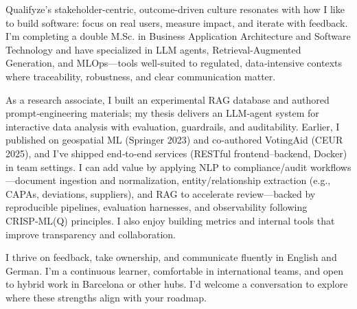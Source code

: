 Qualifyze’s stakeholder-centric, outcome-driven culture resonates with how I like to build software: focus on real users, measure impact, and iterate with feedback. I’m completing a double M.Sc. in Business Application Architecture and Software Technology and have specialized in LLM agents, Retrieval-Augmented Generation, and MLOps—tools well-suited to regulated, data‑intensive contexts where traceability, robustness, and clear communication matter.

As a research associate, I built an experimental RAG database and authored prompt‑engineering materials; my thesis delivers an LLM‑agent system for interactive data analysis with evaluation, guardrails, and auditability. Earlier, I published on geospatial ML (Springer 2023) and co‑authored VotingAid (CEUR 2025), and I’ve shipped end‑to‑end services (RESTful frontend–backend, Docker) in team settings. I can add value by applying NLP to compliance/audit workflows—document ingestion and normalization, entity/relationship extraction (e.g., CAPAs, deviations, suppliers), and RAG to accelerate review—backed by reproducible pipelines, evaluation harnesses, and observability following CRISP‑ML(Q) principles. I also enjoy building metrics and internal tools that improve transparency and collaboration.

I thrive on feedback, take ownership, and communicate fluently in English and German. I’m a continuous learner, comfortable in international teams, and open to hybrid work in Barcelona or other hubs. I’d welcome a conversation to explore where these strengths align with your roadmap.
